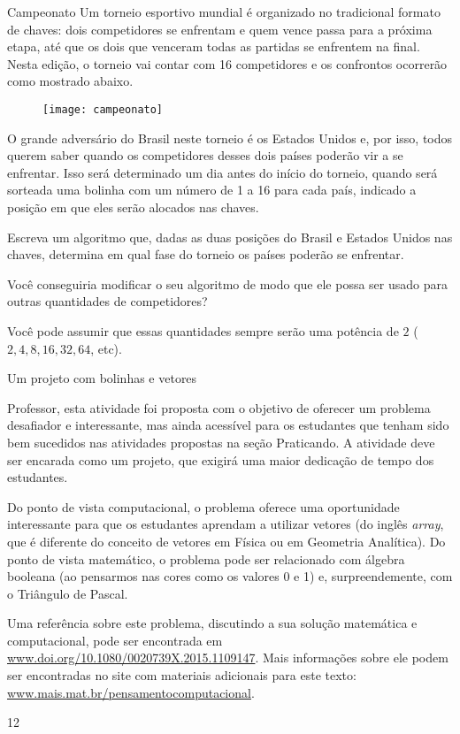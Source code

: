 \newpage

\begin{task}{Campeonato}
Um torneio esportivo mundial é organizado no tradicional formato de chaves: dois competidores se enfrentam e quem vence passa para a próxima etapa, até que os dois que venceram todas as partidas se enfrentem na final. Nesta edição, o torneio vai contar com 16 competidores e os confrontos ocorrerão como mostrado abaixo.

\begin{figure}[H]
\centering

\texttt{[image: campeonato]}
\end{figure}

O grande adversário do Brasil neste torneio é os Estados Unidos e, por isso, todos querem saber quando os competidores desses dois países poderão vir a se enfrentar. Isso será determinado um dia antes do início do torneio, quando será sorteada uma bolinha com um número de 1 a 16 para cada país, indicado a posição em que eles serão alocados nas chaves.

Escreva um algoritmo que, dadas as duas posições do Brasil e Estados Unidos nas chaves, determina em qual fase do torneio os países poderão se enfrentar.
\end{task}

\begin{reflection}
Você conseguiria modificar o seu algoritmo de modo que ele possa ser usado para outras quantidades de competidores?

Você pode assumir que essas quantidades sempre serão uma potência de $2$ ($2, 4, 8, 16, 32, 64$, etc).
\end{reflection}





\newpage

\def\currentcolor{cor2}
\begin{sugestions}{Um projeto com bolinhas e vetores}
{
Professor, esta atividade foi proposta com o objetivo de oferecer um problema desafiador e interessante, mas ainda acessível para os estudantes que tenham sido bem sucedidos nas atividades propostas na seção Praticando. A atividade deve ser encarada como um projeto, que exigirá uma maior dedicação de tempo dos estudantes.

Do ponto de vista computacional, o problema oferece uma oportunidade interessante para que os estudantes aprendam a utilizar vetores (do inglês \textit{array}, que é diferente do conceito de vetores em Física ou em Geometria Analítica). Do ponto de vista matemático, o problema pode ser relacionado com álgebra booleana (ao pensarmos nas cores como os valores 0 e 1) e, surpreendemente, com o Triângulo de Pascal.

Uma referência sobre este problema, discutindo a sua solução matemática e computacional, pode ser encontrada em \url{www.doi.org/10.1080/0020739X.2015.1109147}. Mais informações sobre ele podem ser encontradas no site com materiais adicionais para este texto: \url{www.mais.mat.br/pensamentocomputacional}.
}{1}{2}
\end{sugestions}

